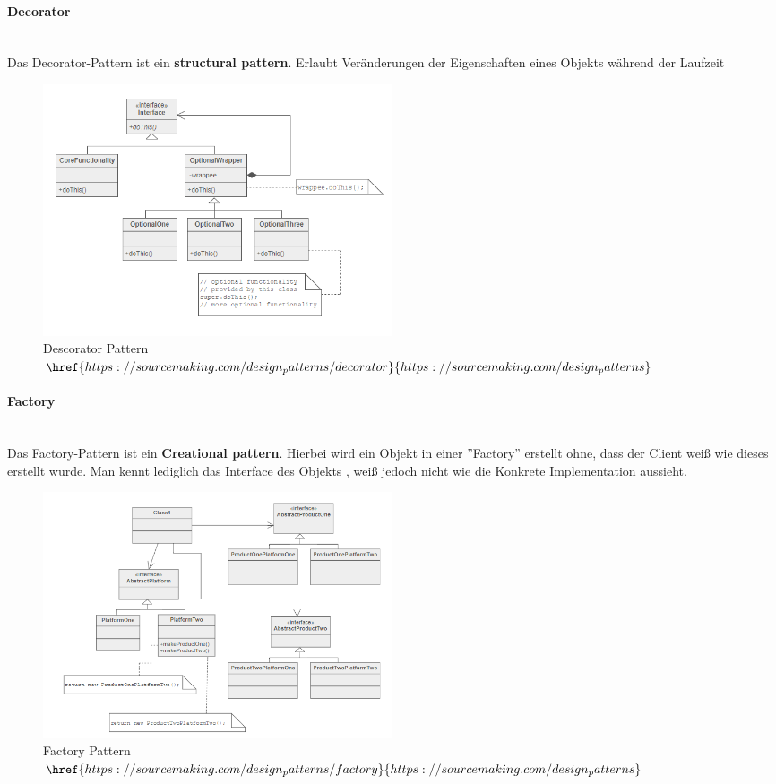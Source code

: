 	\paragraph{Decorator}~\\
Das Decorator-Pattern ist ein \textbf{structural pattern}. Erlaubt Veränderungen der Eigenschaften eines Objekts während der Laufzeit
	\begin{figure}[H]
		\centering
		\includegraphics[width=0.5\textwidth]{images/Decorator.png}
		\caption{ Descorator Pattern \\ $\href{https://sourcemaking.com/design_patterns/decorator}{https://sourcemaking.com/design_patterns}$}
	\end{figure}
	\paragraph{Factory}~\\
Das Factory-Pattern ist ein \textbf{Creational pattern}. Hierbei wird ein Objekt in einer ''Factory'' erstellt ohne, dass der Client weiß wie dieses erstellt wurde. Man kennt lediglich das Interface des Objekts , weiß jedoch nicht wie die Konkrete Implementation aussieht.
\begin{figure}[H]
	\centering
	\includegraphics[width=0.5\textwidth]{images/Factory.png}
	\caption{Factory Pattern \\ $\href{https://sourcemaking.com/design_patterns/factory}{https://sourcemaking.com/design_patterns}$}
\end{figure}
